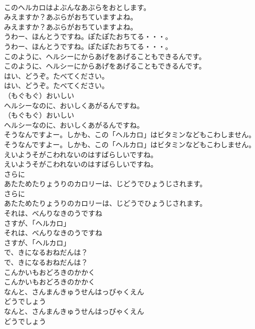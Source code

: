 \documentclass[8pt]{extreport}
\begin{document}
\begin{CJK}{UTF8}{min}
\\	このヘルカロはよぶんなあぶらをおとします。
\\	みえますか？あぶらがおちていますよね。
\\	みえますか？あぶらがおちていますよね。
\\	うわー、ほんとうですね。ぽたぽたおちてる・・・。
\\	うわー、ほんとうですね。ぽたぽたおちてる・・・。
\\	このように、ヘルシーにからあげをあげることもできるんです。
\\	このように、ヘルシーにからあげをあげることもできるんです。
\\	はい、どうぞ。たべてください。
\\	はい、どうぞ。たべてください。
\\	（もぐもぐ）おいしい
\\	ヘルシーなのに、おいしくあがるんですね。
\\	（もぐもぐ）おいしい
\\	ヘルシーなのに、おいしくあがるんですね。
\\	そうなんですよー。しかも、この「ヘルカロ」はビタミンなどもこわしません。
\\	そうなんですよー。しかも、この「ヘルカロ」はビタミンなどもこわしません。
\\	えいようそがこわれないのはすばらしいですね。
\\	えいようそがこわれないのはすばらしいですね。
\\	さらに
\\	あたためたりょうりのカロリーは、じどうでひょうじされます。
\\	さらに
\\	あたためたりょうりのカロリーは、じどうでひょうじされます。
\\	それは、べんりなきのうですね
\\	さすが、「ヘルカロ」
\\	それは、べんりなきのうですね
\\	さすが、「ヘルカロ」
\\	で、きになるおねだんは？
\\	で、きになるおねだんは？
\\	こんかいもおどろきのかかく
\\	こんかいもおどろきのかかく
\\	なんと、さんまんきゅうせんはっぴゃくえん
\\	どうでしょう
\\	なんと、さんまんきゅうせんはっぴゃくえん
\\	どうでしょう

\end{CJK}
\end{document}
